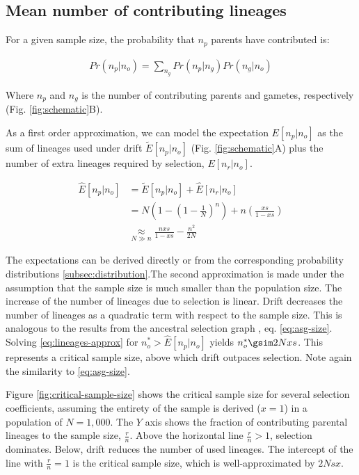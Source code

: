 \documentclass[review]{elsarticle}
\begin{document}
\subsection{Mean number of contributing lineages}
\label{sec:mean-contr}

For a given sample size, the probability that $n_p$ parents have contributed is:

\begin{align}
  \label{eq:conditional}
  Pr(n_p | n_o) = \sum_{n_g} Pr(n_p | n_g)Pr(n_g | n_o)
\end{align}

Where $n_p$ and $n_g$ is the number of contributing parents and gametes, respectively (Fig.
\ref{fig:schematic}B).

As a first order approximation, we can model the expectation $E[n_p | n_o]$ as the sum of lineages
used under drift $\tilde{E}[n_p | n_o]$ (Fig. \ref{fig:schematic}A) plus the number of extra
lineages required by selection, $E[n_r | n_o]$.

\begin{equation*}
  \begin{aligned}
    \label{eq:lineages-approx}
    \hat{E}[n_p  | n_o] &= \tilde{E}[n_p | n_o] + \hat{E}[n_r | n_o] \\
    &= N(1-\left( 1 - \frac{1}{N} \right)^n) + n\left( \frac{xs}{1-xs}\right) \\
    &\underset{N\gg n}{\approx} \frac{nxs}{1-xs} - \frac{n^2}{2N}
  \end{aligned}
\end{equation*}

The expectations can be derived directly or from the corresponding probability distributions
\ref{subsec:distribution}.The second approximation is made under the assumption that the sample size
is much smaller than the population size. The increase of the number of lineages due to selection is
linear. Drift decreases the number of lineages as a quadratic term with respect to the sample size.
This is analogous to the results from the ancestral selection graph \citep{KroneNeuhauser1997}, eq.
\eqref{eq:asg-size}. Solving \eqref{eq:lineages-approx} for $n_o^* > \hat{E}[n_p | n_o]$ yields
$n_o^* \gsim 2Nxs$. This represents a critical sample size, above which drift outpaces selection.
Note again the similarity to \eqref{eq:asg-size}.

Figure \ref{fig:critical-sample-size} shows the critical sample size for several selection
coefficients, assuming the entirety of the sample is derived ($x=1$) in a population of $N=1,000$.
The $Y$ axis shows the fraction of contributing parental lineages to the sample size, $\frac{r}{n}$.
Above the horizontal line $\frac{r}{n} > 1$, selection dominates. Below, drift reduces the number of
used lineages. The intercept of the line with $\frac{r}{n} = 1$ is the critical sample size, which
is well-approximated by $2Nsx$.
\end{document}
